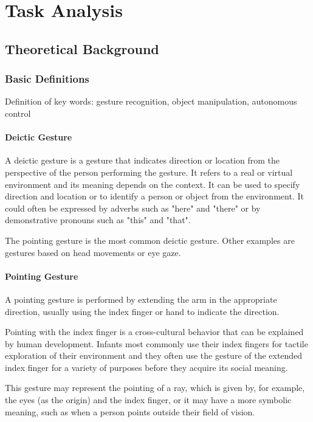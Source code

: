\chapter{Task Analysis}


\section{Theoretical Background}

\subsection{Basic Definitions}
Definition of key words:
gesture recognition, object manipulation, autonomous control

\subsubsection{Deictic Gesture}
A deictic gesture is a gesture that indicates direction or location from the perspective of the person performing the gesture. It refers to a real or virtual environment and its meaning depends on the context.
It can be used to specify direction and location or to identify a person or object from the environment. It could often be expressed by adverbs such as "here" and "there" or by demonstrative pronouns such as "this" and "that".\par
The pointing gesture is the most common deictic gesture. Other examples are gestures based on head movements or eye gaze.\par

\subsubsection{Pointing Gesture}
A pointing gesture is performed by extending the arm in the appropriate direction, usually using the index finger or hand to indicate the direction.\par
Pointing with the index finger is a cross-cultural behavior that can be explained by human development. Infants most commonly use their index fingers for tactile exploration of their environment and they often use the gesture of the extended index finger for a variety of purposes before they acquire its social meaning.\par
This gesture may represent the pointing of a ray, which is given by, for example, the eyes (as the origin) and the index finger, or it may have a more symbolic meaning, such as when a person points outside their field of vision.\par

